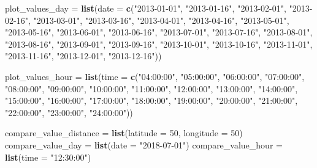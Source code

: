\documentclass[]{article}
\newenvironment{Shaded}{\begin{snugshade}}{\end{snugshade}}
\newcommand{\KeywordTok}[1]{\textcolor[rgb]{0.13,0.29,0.53}{\textbf{#1}}}
\newcommand{\DataTypeTok}[1]{\textcolor[rgb]{0.13,0.29,0.53}{#1}}
\newcommand{\DecValTok}[1]{\textcolor[rgb]{0.00,0.00,0.81}{#1}}
\newcommand{\StringTok}[1]{\textcolor[rgb]{0.31,0.60,0.02}{#1}}
\newcommand{\NormalTok}[1]{#1}
\begin{document}
\begin{Shaded}
\begin{Highlighting}[]
{{{{{{\NormalTok{plot_values_day =}
\StringTok{  }\KeywordTok{list}\NormalTok{(}\DataTypeTok{date =} \KeywordTok{c}\NormalTok{(}\StringTok{"2013-01-01"}\NormalTok{, }\StringTok{"2013-01-16"}\NormalTok{, }\StringTok{"2013-02-01"}\NormalTok{, }\StringTok{"2013-02-16"}\NormalTok{,}
                \StringTok{"2013-03-01"}\NormalTok{, }\StringTok{"2013-03-16"}\NormalTok{, }\StringTok{"2013-04-01"}\NormalTok{, }\StringTok{"2013-04-16"}\NormalTok{,}
                \StringTok{"2013-05-01"}\NormalTok{, }\StringTok{"2013-05-16"}\NormalTok{, }\StringTok{"2013-06-01"}\NormalTok{, }\StringTok{"2013-06-16"}\NormalTok{,}
                \StringTok{"2013-07-01"}\NormalTok{, }\StringTok{"2013-07-16"}\NormalTok{, }\StringTok{"2013-08-01"}\NormalTok{, }\StringTok{"2013-08-16"}\NormalTok{,}
                \StringTok{"2013-09-01"}\NormalTok{, }\StringTok{"2013-09-16"}\NormalTok{, }\StringTok{"2013-10-01"}\NormalTok{, }\StringTok{"2013-10-16"}\NormalTok{,}
                \StringTok{"2013-11-01"}\NormalTok{, }\StringTok{"2013-11-16"}\NormalTok{, }\StringTok{"2013-12-01"}\NormalTok{, }\StringTok{"2013-12-16"}\NormalTok{))}

\NormalTok{plot_values_hour =}
\StringTok{  }\KeywordTok{list}\NormalTok{(}\DataTypeTok{time =} \KeywordTok{c}\NormalTok{(}\StringTok{"04:00:00"}\NormalTok{, }\StringTok{"05:00:00"}\NormalTok{, }\StringTok{"06:00:00"}\NormalTok{, }\StringTok{"07:00:00"}\NormalTok{,}
                \StringTok{"08:00:00"}\NormalTok{, }\StringTok{"09:00:00"}\NormalTok{, }\StringTok{"10:00:00"}\NormalTok{, }\StringTok{"11:00:00"}\NormalTok{,}
                \StringTok{"12:00:00"}\NormalTok{, }\StringTok{"13:00:00"}\NormalTok{, }\StringTok{"14:00:00"}\NormalTok{, }\StringTok{"15:00:00"}\NormalTok{,}
                \StringTok{"16:00:00"}\NormalTok{, }\StringTok{"17:00:00"}\NormalTok{, }\StringTok{"18:00:00"}\NormalTok{, }\StringTok{"19:00:00"}\NormalTok{,}
                \StringTok{"20:00:00"}\NormalTok{, }\StringTok{"21:00:00"}\NormalTok{, }\StringTok{"22:00:00"}\NormalTok{, }\StringTok{"23:00:00"}\NormalTok{,}
                \StringTok{"24:00:00"}\NormalTok{))}

\NormalTok{compare_value_distance =}\StringTok{ }\KeywordTok{list}\NormalTok{(}\DataTypeTok{latitude =} \DecValTok{50}\NormalTok{, }\DataTypeTok{longitude =} \DecValTok{50}\NormalTok{)}
\NormalTok{compare_value_day =}\StringTok{ }\KeywordTok{list}\NormalTok{(}\DataTypeTok{date =} \StringTok{"2018-07-01"}\NormalTok{)}
\NormalTok{compare_value_hour =}\StringTok{ }\KeywordTok{list}\NormalTok{(}\DataTypeTok{time =} \StringTok{"12:30:00"}\NormalTok{)}

}}}}}}
\end{Highlighting}
\end{Shaded}
\end{document}
